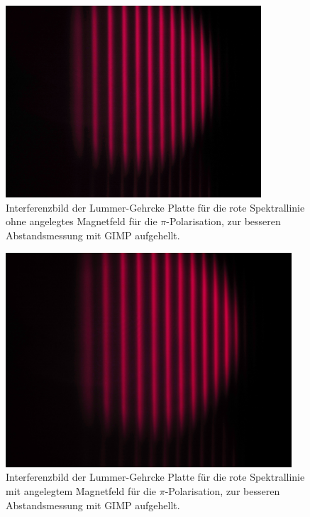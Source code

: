 \begin{figure}[h!]
  \centering
  \includegraphics[width=0.85\textwidth]{data/temp/rot_ohneB_90_aufgehellt.JPG}
  \caption{Interferenzbild der Lummer-Gehrcke Platte für die rote Spektrallinie ohne angelegtes Magnetfeld für die $\pi$-Polarisation, zur besseren Abstandsmessung mit GIMP aufgehellt.}
  \label{fig:roteOhneB90_aufgehellt}
\end{figure}
\begin{figure}[h!]
  \centering
  \includegraphics[width=0.95\textwidth]{data/temp/rot_mitB_90_aufgehellt.JPG}
  \caption{Interferenzbild der Lummer-Gehrcke Platte für die rote Spektrallinie mit angelegtem Magnetfeld für die $\pi$-Polarisation, zur besseren Abstandsmessung mit GIMP aufgehellt.}
  \label{fig:rotMitB90_aufgehellt}
\end{figure}



